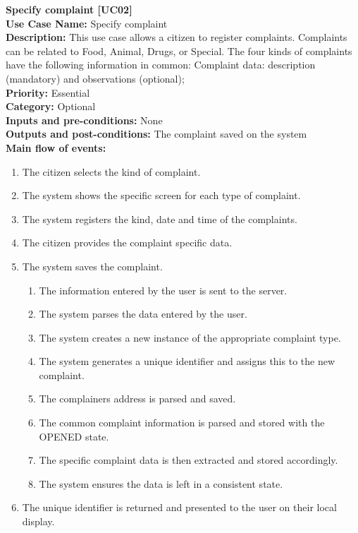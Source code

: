 \documentclass[11pt,twoside]{article}
\begin{document}
\textbf{Specify complaint [UC02]}\\
\textbf{Use Case Name:} Specify complaint\\
\textbf{Description:} This use case allows a citizen to register complaints. Complaints can be related to Food, Animal, Drugs, or
Special. The four kinds of complaints have the following information in common: Complaint data: description (mandatory) and observations
(optional);\\
\textbf{Priority:} Essential \\ 
\textbf{Category:} Optional \\ 
\textbf{Inputs and pre-conditions:} None\\ 
\textbf{Outputs and post-conditions:}  The complaint saved on the system\\  
\textbf{Main flow of events:}\\
\begin{enumerate}
\item The citizen selects the kind of complaint.
\item The system shows the specific screen for each type of complaint.
\item The system registers the kind, date and time of the complaints.
\item The citizen provides the complaint specific data.
\item \label{uc02:ep01}The system saves the complaint.
\begin{enumerate}
\item The information entered by the user is sent to the server.
\item The system parses the data entered by the user.
\item The system creates a new instance of the appropriate complaint
type.
\item The system generates a unique identifier and assigns this to the new
complaint.
\item The complainers address is parsed and saved.
\item The common complaint information is parsed and stored with the
OPENED state.
\item The specific complaint data is then extracted and stored accordingly.
\item The system ensures the data is left in a consistent state.
\end{enumerate}
\item The unique identifier is returned and presented to the user on their local
display.
\end{enumerate}
\end{document}
